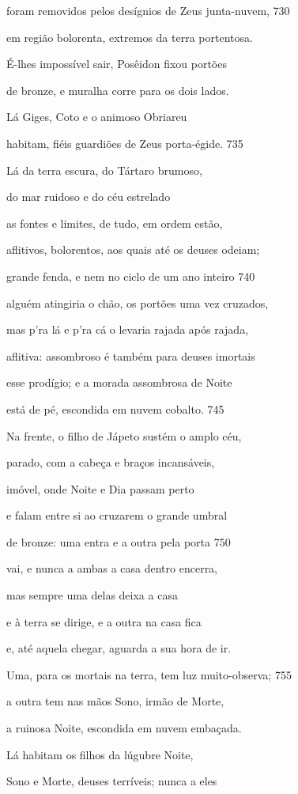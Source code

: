 foram removidos pelos desígnios de Zeus junta-nuvem, \num{730}

em região bolorenta, extremos da terra portentosa.

É-lhes impossível sair, Posêidon fixou portões

de bronze, e muralha corre para os dois lados.

\quad{}Lá Giges, Coto e o animoso Obriareu

habitam, fiéis guardiões de Zeus porta-égide. \num{735}

\quad{}Lá da terra escura, do Tártaro brumoso,

do mar ruidoso e do céu estrelado

as fontes e limites, de tudo, em ordem estão,

aflitivos, bolorentos, aos quais até os deuses odeiam;

grande fenda, e nem no ciclo de um ano inteiro \num{740}

alguém atingiria o chão, os portões uma vez cruzados,

mas p'ra lá e p'ra cá o levaria rajada após rajada,

aflitiva: assombroso é também para deuses imortais

esse prodígio; e a morada assombrosa de Noite

está de pé, escondida em nuvem cobalto. \num{745}

\quad{}Na frente, o filho de Jápeto sustém o amplo céu,

parado, com a cabeça e braços incansáveis,

imóvel, onde Noite e Dia passam perto

e falam entre si ao cruzarem o grande umbral

de bronze: uma entra e a outra pela porta \num{750}

vai, e nunca a ambas a casa dentro encerra,

mas sempre uma delas deixa a casa

e à terra se dirige, e a outra na casa fica

e, até aquela chegar, aguarda a sua hora de ir.

Uma, para os mortais na terra, tem luz muito-observa; \num{755}

a outra tem nas mãos Sono, irmão de Morte,

a ruinosa Noite, escondida em nuvem embaçada.

\quad{}Lá habitam os filhos da lúgubre Noite,

Sono e Morte, deuses terríveis; nunca a eles

